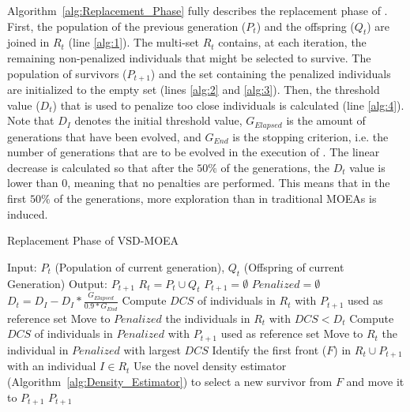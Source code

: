 Algorithm~\ref{alg:Replacement_Phase} fully describes the replacement phase of \VSDMOEA{}.
%
First, the population of the previous generation ($P_t$) and the offspring ($Q_t$) are joined
in $R_t$ (line \ref{alg:1}).
%
The multi-set $R_t$ contains, at each iteration, the remaining non-penalized individuals that might be selected 
to survive.
%
The population of survivors ($P_{t+1}$) and the set containing the penalized individuals are initialized to
the empty set (lines \ref{alg:2} and \ref{alg:3}).
%
Then, the threshold value ($D_t$) that is used to penalize too close individuals is calculated (line \ref{alg:4}).
%
Note that $D_I$ denotes the initial threshold value, $G_{Elapsed}$ is the amount of generations that have 
been evolved, and $G_{End}$ is the stopping criterion, i.e. the number of generations that are to be evolved 
in the execution of \VSDMOEA{}.
%
The linear decrease is calculated so that after the $50\%$ of the generations, the $D_t$ value is lower than 0, 
meaning that no penalties are performed.
%
This means that in the first $50\%$ of the generations, more exploration than in traditional MOEAs is induced.
%

\begin{algorithm}[t]
	\caption{Replacement Phase of VSD-MOEA} 
\begin{small}
\begin{algorithmic}[1]
\STATE Input: $P_t$ (Population of current generation), $Q_t$ (Offspring of current Generation)
    	\STATE Output: $P_{t+1}$ 
        \STATE $R_t = P_t \cup Q_t$ \label{alg:1}
        \STATE $P_{t+1} = \emptyset$ \label{alg:2}
        \STATE $Penalized = \emptyset$ \label{alg:3}
				\STATE $D_t = D_I - D_I * \frac{G_{Elapsed}}{0.9*G_{End}}$ \label{alg:4}
         \label{alg:6}
					\STATE Compute $DCS$ of individuals in $R_t$ with $P_{t+1}$ used as reference set \label{alg:7}
					\STATE Move to $Penalized$ the individuals in $R_t$ with $DCS < D_t$  \label{alg:8}
        	 \label{alg:9}
						\STATE Compute $DCS$ of individuals in $Penalized$ with $P_{t+1}$ used as reference set \label{alg:10}
						\STATE Move to $R_t$ the individual in $Penalized$ with largest $DCS$ \label{alg:11}
        	\ENDIF
					\STATE Identify the first front ($F$) in $R_t \cup P_{t+1}$ with an individual $I \in R_t$ \label{alg:12}
					\STATE Use the novel density estimator (Algorithm~\ref{alg:Density_Estimator}) to select a new survivor 
					from $F$ and move it to $P_{t+1}$\label{alg:13}
        \ENDWHILE
    	\RETURN $P_{t+1}$ \label{alg:14}
	\end{algorithmic}
\end{small}
\label{alg:Replacement_Phase}
\end{algorithm}

